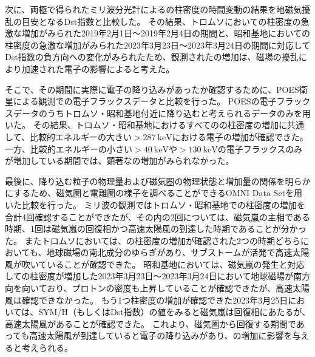 次に、両極で得られたミリ波分光計によるの柱密度の時間変動の結果を地磁気擾乱の目安となるDst指数と比較した。
その結果、トロムソにおいての柱密度の急激な増加がみられた2019年2月1日～2019年2月4日の期間と、昭和基地においての柱密度の急激な増加がみられた2023年3月23日〜2023年3月24日の期間に対応してDst指数の負方向への変化がみられたため、観測されたの増加は、磁場の擾乱により加速された電子の影響によると考えた。\par

そこで、その期間に実際に電子の降り込みがあったか確認するために、POES衛星による観測での電子フラックスデータと比較を行った。
POESの電子フラックスデータのうちトロムソ・昭和基地付近に降り込むと考えられるデータのみを用いた。
その結果、トロムソ・昭和基地におけるすべてのの柱密度の増加に共通して、比較的エネルギーの大きい$>287\ \mathrm{keV}$における電子の増加が確認できた。
一方、比較的エネルギーの小さい$>40\ \mathrm{keV}$や$>130\ \mathrm{keV}$の電子フラックスのみが増加している期間では、顕著なの増加がみられなかった。\par

最後に、降り込む粒子の物理量および磁気圏の物理状態と増加量の関係を明らかにするため、磁気圏と電離圏の様子を調べることができるOMNI Data Setを用いた比較を行った。
ミリ波の観測ではトロムソ・昭和基地での柱密度の増加を合計4回確認することができたが、その内の2回については、磁気嵐の主相である時期、1回は磁気嵐の回復相かつ高速太陽風の到達した時期であることが分かった。
またトロムソにおいては、の柱密度の増加が確認された2つの時期どちらにおいても、地球磁場の南北成分のゆらぎがあり、サブストームが活発で高速太陽風が吹いていることが確認できた。
昭和基地においては、磁気嵐の発生と対応しての柱密度が増加した2023年3月23日〜2023年3月24日において地球磁場が南方向を向いており、プロトンの密度も上昇していることが確認できたが、高速太陽風は確認できなかった。
もう1つ柱密度の増加が確認できた2023年3月25日においては、SYM/H（もしくはDst指数）の値をみると磁気嵐は回復相にあたるが、高速太陽風があることが確認できた。
これより、磁気圏から回復する期間であっても高速太陽風が到達していると電子の降り込みがあり、の増加に影響を与えると考えられる。
